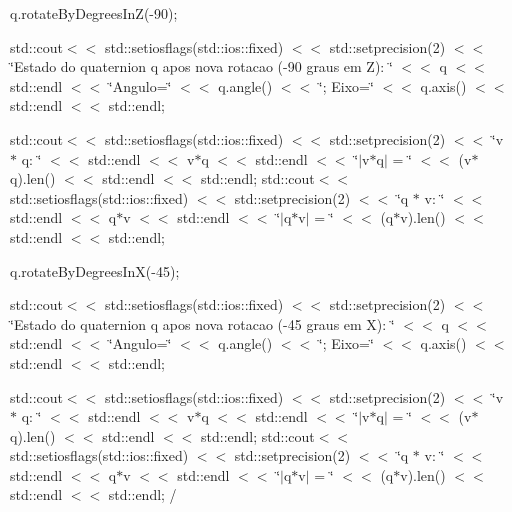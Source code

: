 q.\+rotate\+By\+Degrees\+In\+Z(-\/90);

std\+::cout$<$$<$ std\+::setiosflags(std\+::ios\+::fixed) $<$$<$ std\+::setprecision(2) $<$$<$ \char`\"{}\+Estado do quaternion q apos nova rotacao (-\/90 graus em Z)\+: \char`\"{} $<$$<$ q $<$$<$ std\+::endl $<$$<$ \char`\"{}\+Angulo=\char`\"{} $<$$<$ q.\+angle() $<$$<$ \char`\"{}; Eixo=\char`\"{} $<$$<$ q.\+axis() $<$$<$ std\+::endl $<$$<$ std\+::endl;

std\+::cout$<$$<$ std\+::setiosflags(std\+::ios\+::fixed) $<$$<$ std\+::setprecision(2) $<$$<$ \char`\"{}v $\ast$ q\+: \char`\"{} $<$$<$ std\+::endl $<$$<$ v$\ast$q $<$$<$ std\+::endl $<$$<$ \char`\"{}$\vert$v$\ast$q$\vert$ = \char`\"{} $<$$<$ (v$\ast$q).len() $<$$<$ std\+::endl $<$$<$ std\+::endl; std\+::cout$<$$<$ std\+::setiosflags(std\+::ios\+::fixed) $<$$<$ std\+::setprecision(2) $<$$<$ \char`\"{}q $\ast$ v\+: \char`\"{} $<$$<$ std\+::endl $<$$<$ q$\ast$v $<$$<$ std\+::endl $<$$<$ \char`\"{}$\vert$q$\ast$v$\vert$ = \char`\"{} $<$$<$ (q$\ast$v).len() $<$$<$ std\+::endl $<$$<$ std\+::endl;

q.\+rotate\+By\+Degrees\+In\+X(-\/45);

std\+::cout$<$$<$ std\+::setiosflags(std\+::ios\+::fixed) $<$$<$ std\+::setprecision(2) $<$$<$ \char`\"{}\+Estado do quaternion q apos nova rotacao (-\/45 graus em X)\+: \char`\"{} $<$$<$ q $<$$<$ std\+::endl $<$$<$ \char`\"{}\+Angulo=\char`\"{} $<$$<$ q.\+angle() $<$$<$ \char`\"{}; Eixo=\char`\"{} $<$$<$ q.\+axis() $<$$<$ std\+::endl $<$$<$ std\+::endl;

std\+::cout$<$$<$ std\+::setiosflags(std\+::ios\+::fixed) $<$$<$ std\+::setprecision(2) $<$$<$ \char`\"{}v $\ast$ q\+: \char`\"{} $<$$<$ std\+::endl $<$$<$ v$\ast$q $<$$<$ std\+::endl $<$$<$ \char`\"{}$\vert$v$\ast$q$\vert$ = \char`\"{} $<$$<$ (v$\ast$q).len() $<$$<$ std\+::endl $<$$<$ std\+::endl; std\+::cout$<$$<$ std\+::setiosflags(std\+::ios\+::fixed) $<$$<$ std\+::setprecision(2) $<$$<$ \char`\"{}q $\ast$ v\+: \char`\"{} $<$$<$ std\+::endl $<$$<$ q$\ast$v $<$$<$ std\+::endl $<$$<$ \char`\"{}$\vert$q$\ast$v$\vert$ = \char`\"{} $<$$<$ (q$\ast$v).len() $<$$<$ std\+::endl $<$$<$ std\+::endl; /

